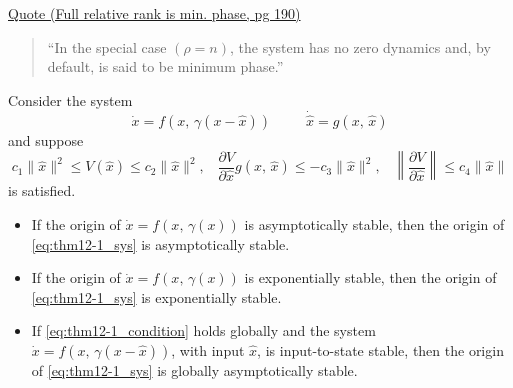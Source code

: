 \documentclass[twocolumn]{article}    %
\begin{document}
\noindent\underline{Quote (Full relative rank is min. phase, pg 190)}
\begin{quote}
    ``In the special case \((\rho=n)\), the system has no zero dynamics and, by default, is said to be minimum phase.''
\end{quote}

\begin{remark}[12.1, pg 298]
    Consider the system 
    \begin{equation} \label{eq:thm12-1_sys}
        \dot{x} = f(x,\,\gamma(x-\hat{x})) \hspace{30pt} \dot{\hat{x}} = g(x,\,\hat{x})
    \end{equation}
    and suppose 
    \begin{equation} \label{eq:thm12-1_condition}
        c_1\|\hat{x}\|^2 \leq V(\hat{x}) \leq c_2\|\hat{x}\|^2, \hspace{10pt} \frac{\partial V}{\partial \hat{x}}g(x,\, \hat{x}) \leq -c_3\|\hat{x}\|^2, \hspace{10pt} \left\|\frac{\partial V}{\partial \hat{x}}\right\|\leq c_4\|\hat{x}\|
    \end{equation}
    is satisfied. 
    \begin{itemize}
        \item If the origin of \(\dot{x} = f(x,\, \gamma(x))\) is asymptotically stable, then the origin of \eqref{eq:thm12-1_sys} is asymptotically stable.
        \item If the origin of \(\dot{x} = f(x,\, \gamma(x))\) is exponentially stable, then the origin of \eqref{eq:thm12-1_sys} is exponentially stable.
        \item If \eqref{eq:thm12-1_condition} holds globally and the system \(\dot{x} = f(x,\, \gamma(x - \hat{x}))\), with input \(\hat{x}\), is input-to-state stable, then the origin of \eqref{eq:thm12-1_sys} is globally asymptotically stable.
    \end{itemize}
\end{remark}


\end{document}
